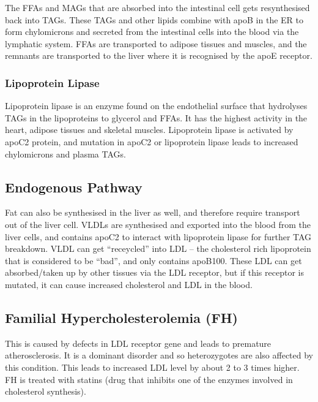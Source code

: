 \documentclass[a4paper, 12pt]{report}
\begin{document}
The FFAs and MAGs that are absorbed into the intestinal cell gets resynthesised back into TAGs.
These TAGs and other lipids combine with apoB in the ER to form chylomicrons and secreted from the intestinal cells into the blood via the lymphatic system.
FFAs are transported to adipose tissues and muscles, and the remnants are transported to the liver where it is recognised by the apoE receptor.

\subsubsection{Lipoprotein Lipase}

Lipoprotein lipase is an enzyme found on the endothelial surface that hydrolyses TAGs in the lipoproteins to glycerol and FFAs.
It has the highest activity in the heart, adipose tissues and skeletal muscles.
Lipoprotein lipase is activated by apoC2 protein, and mutation in apoC2 or lipoprotein lipase leads to increased chylomicrons and plasma TAGs.

\subsection{Endogenous Pathway}

Fat can also be synthesised in the liver as well, and therefore require transport out of the liver cell.
VLDLs are synthesised and exported into the blood from the liver cells, and contains apoC2 to interact with lipoprotein lipase for further TAG breakdown.
VLDL can get ``receycled'' into LDL -- the cholesterol rich lipoprotein that is considered to be ``bad'', and only contains apoB100.
These LDL can get absorbed/taken up by other tissues via  the LDL receptor, but if this receptor is mutated, it can cause increased cholesterol and LDL in the blood.

\subsection{Familial Hypercholesterolemia (FH)}

This is caused by defects in LDL receptor gene and leads to premature atherosclerosis.
It is a dominant disorder and so heterozygotes are also affected by this condition.
This leads to increased LDL level by about 2 to 3 times higher.
FH is treated with statins (drug that inhibits one of the enzymes involved in cholesterol synthesis).
\end{document}

